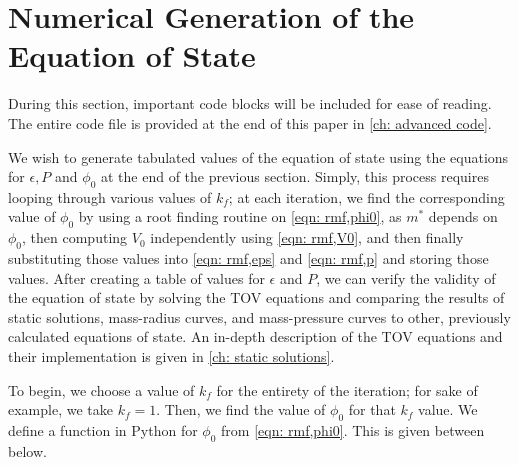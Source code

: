


\section{Numerical Generation of the Equation of State}

During this section, important code blocks will be included for ease of reading. The entire code file is provided at the end of this paper in \autoref{ch: advanced code}.

We wish to generate tabulated values of the equation of state using the equations for $\epsilon, P$ and $\phi_0$ at the end of the previous section. Simply, this process requires looping through various values of $k_f$; at each iteration, we find the corresponding value of $\phi_0$ by using a root finding routine on \eqref{eqn: rmf,phi0}, as $m^*$ depends on $\phi_0$, then computing $V_0$ independently using \eqref{eqn: rmf,V0}, and then finally substituting those values into \eqref{eqn: rmf,eps} and \eqref{eqn: rmf,p} and storing those values. After creating a table of values for $\epsilon$ and $P$, we can verify the validity of the equation of state by solving the TOV equations and comparing the results of static solutions, mass-radius curves, and mass-pressure curves to other, previously calculated equations of state. An in-depth description of the TOV equations and their implementation is given in \autoref{ch: static solutions}.

To begin, we choose a value of $k_f$ for the entirety of the iteration; for sake of example, we take $k_f = 1$. Then, we find the value of $\phi_0$ for that $k_f$ value. We define a function in Python for $\phi_0$ from \eqref{eqn: rmf,phi0}. This is given between below.

